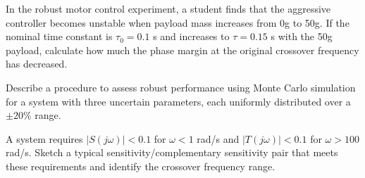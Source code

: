 \begin{exercise}
In the robust motor control experiment, a student finds that the aggressive controller becomes unstable when payload mass increases from 0g to 50g. If the nominal time constant is $\tau_0 = 0.1$ s and increases to $\tau = 0.15$ s with the 50g payload, calculate how much the phase margin at the original crossover frequency has decreased.
\end{exercise}

\begin{exercise}
Describe a procedure to assess robust performance using Monte Carlo simulation for a system with three uncertain parameters, each uniformly distributed over a $\pm 20\%$ range.
\end{exercise}

\begin{exercise}
A system requires $|S(j\omega)| < 0.1$ for $\omega < 1$ rad/s and $|T(j\omega)| < 0.1$ for $\omega > 100$ rad/s. Sketch a typical sensitivity/complementary sensitivity pair that meets these requirements and identify the crossover frequency range.
\end{exercise}

